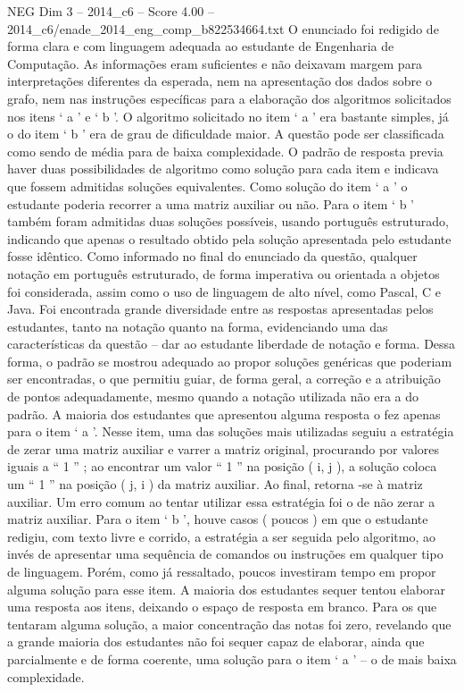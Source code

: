 \begin{textsample}{NEG Dim 3 – 2014\_c6 – Score 4.00 – 2014\_c6/enade\_2014\_eng\_comp\_b822534664.txt}
O enunciado foi redigido de forma clara e com linguagem adequada ao estudante de Engenharia de Computação.
As informações eram suficientes e não deixavam margem para interpretações diferentes da esperada, nem na apresentação dos dados sobre o grafo, nem nas instruções específicas para a elaboração dos algoritmos solicitados nos itens ‘ a ’ e ‘ b ’.
O algoritmo solicitado no item ‘ a ’ era bastante simples, já o do item ‘ b ’ era de grau de dificuldade maior.
A questão pode ser classificada como sendo de média para de baixa complexidade.
O padrão de resposta previa haver duas possibilidades de algoritmo como solução para cada item e indicava que fossem admitidas soluções equivalentes.
Como solução do item ‘ a ’ o estudante poderia recorrer a uma matriz auxiliar ou não.
Para o item ‘ b ’ também foram admitidas duas soluções possíveis, usando português estruturado, indicando que apenas o resultado obtido pela solução apresentada pelo estudante fosse idêntico.
Como informado no final do enunciado da questão, qualquer notação em português estruturado, de forma imperativa ou orientada a objetos foi considerada, assim como o uso de linguagem de alto nível, como Pascal, C e Java.
Foi encontrada grande diversidade entre as respostas apresentadas pelos estudantes, tanto na notação quanto na forma, evidenciando uma das características da questão – dar ao estudante liberdade de notação e forma.
Dessa forma, o padrão se mostrou adequado ao propor soluções genéricas que poderiam ser encontradas, o que permitiu guiar, de forma geral, a correção e a atribuição de pontos adequadamente, mesmo quando a notação utilizada não era a do padrão.
A maioria dos estudantes que apresentou alguma resposta o fez apenas para o item ‘ a ’.
Nesse item, uma das soluções mais utilizadas seguiu a estratégia de zerar uma matriz auxiliar e varrer a matriz original, procurando por valores iguais a “ 1 ” ; ao encontrar um valor “ 1 ” na posição ( i, j ), a solução coloca um “ 1 ” na posição ( j, i ) da matriz auxiliar.
Ao final, retorna -se à matriz auxiliar.
Um erro comum ao tentar utilizar essa estratégia foi o de não zerar a matriz auxiliar.
Para o item ‘ b ’, houve casos ( poucos ) em que o estudante redigiu, com texto livre e corrido, a estratégia a ser seguida pelo algoritmo, ao invés de apresentar uma sequência de comandos ou instruções em qualquer tipo de linguagem.
Porém, como já ressaltado, poucos investiram tempo em propor alguma solução para esse item.
A maioria dos estudantes sequer tentou elaborar uma resposta aos itens, deixando o espaço de resposta em branco.
Para os que tentaram alguma solução, a maior concentração das notas foi zero, revelando que a grande maioria dos estudantes não foi sequer capaz de elaborar, ainda que parcialmente e de forma coerente, uma solução para o item ‘ a ’ – o de mais baixa complexidade.

\end{textsample}
